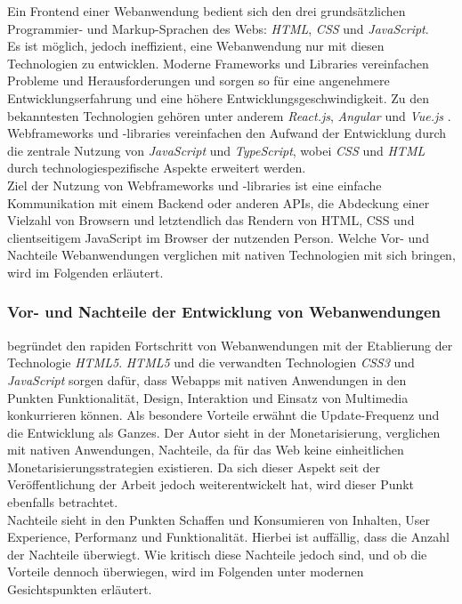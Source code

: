 \documentclass[a4paper]{scrartcl}
\begin{document}
Ein Frontend einer Webanwendung bedient sich den drei grundsätzlichen Programmier- und Markup-Sprachen des Webs: \textit{HTML}, \textit{CSS} und \textit{JavaScript}. \\
Es ist möglich, jedoch ineffizient, eine Webanwendung nur mit diesen Technologien zu entwicklen. Moderne Frameworks und Libraries vereinfachen Probleme und Herausforderungen und sorgen so für eine angenehmere Entwicklungserfahrung und eine höhere Entwicklungsgeschwindigkeit. Zu den bekanntesten Technologien gehören unter anderem \textit{React.js}, \textit{Angular} und \textit{Vue.js} \autocite{Clement}. Webframeworks und -libraries vereinfachen den Aufwand der Entwicklung durch die zentrale Nutzung von \textit{JavaScript} und \textit{TypeScript}, wobei \textit{CSS} und \textit{HTML} durch technologiespezifische Aspekte erweitert werden. \\
Ziel der Nutzung von Webframeworks und -libraries ist eine einfache Kommunikation mit einem Backend oder anderen APIs, die Abdeckung einer Vielzahl von Browsern und letztendlich das Rendern von HTML, CSS und clientseitigem JavaScript im Browser der nutzenden Person. Welche Vor- und Nachteile Webanwendungen verglichen mit nativen Technologien mit sich bringen, wird im Folgenden erläutert.

\subsubsection{Vor- und Nachteile der Entwicklung von Webanwendungen}

\textcite[27]{Jobe} begründet den rapiden Fortschritt von Webanwendungen mit der Etablierung der Technologie \textit{HTML5}. \textit{HTML5} und die verwandten Technologien \textit{CSS3} und \textit{JavaScript} sorgen dafür, dass Webapps mit nativen Anwendungen in den Punkten Funktionalität, Design, Interaktion und Einsatz von Multimedia konkurrieren können. Als besondere Vorteile erwähnt \textcite[28]{Jobe} die Update-Frequenz und die Entwicklung als Ganzes. Der Autor sieht in der Monetarisierung, verglichen mit nativen Anwendungen, Nachteile, da für das Web keine einheitlichen Monetarisierungsstrategien existieren. Da sich dieser Aspekt seit der Veröffentlichung der Arbeit jedoch weiterentwickelt hat, wird dieser Punkt ebenfalls betrachtet. \\
Nachteile sieht \textcite[28]{Jobe} in den Punkten Schaffen und Konsumieren von Inhalten, User Experience, Performanz und Funktionalität. Hierbei ist auffällig, dass die Anzahl der Nachteile überwiegt. Wie kritisch diese Nachteile jedoch sind, und ob die Vorteile dennoch überwiegen, wird im Folgenden unter modernen Gesichtspunkten erläutert. \\
\end{document}
